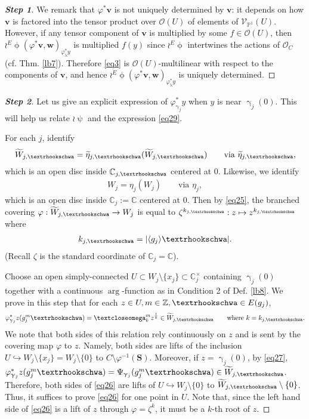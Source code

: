 \documentclass[11pt,b5paper,notitlepage]{article}
\theoremstyle{definition}
\theoremstyle{plain}
\newcommand{\wtd}{\widetilde}
\newcommand{\bk}[1]{\langle {#1}\rangle}
\newcommand{\scr}{\mathscr}
\newcommand{\Cbb}{\mathbb C}
\newcommand{\Zbb}{\mathbb Z}
\newcommand{\Pbb}{\mathbb P}
\newcommand{\Sbf}{\mathbf{S}}
\newcommand{\vbf}{\mathbf v}
\newcommand{\wbf}{\mathbf w}
\newcommand{\tipaomega}{\text{\textcloseomega}}
\newcommand{\tipae}{\text{\textrhookschwa}}
\numberwithin{equation}{subsection}
\begin{document}
\begin{proof}[\textbf{Step 1}]
We remark that $\varphi^*\vbf$ is not uniquely determined by $\vbf$: it depends  on how $\vbf$ is factored into the tensor product over $\scr O(U)$ of elements of $\scr V_{\Pbb^1}(U)$. However, if any tensor component of $\vbf$ is multiplied by some $f\in\scr O(U)$, then $\wr^E\upphi(\varphi^*\vbf,\wbf)_{\varphi_\uplambda^*y}$ is multiplied $f(y)$ since $\wr^E\upphi$ intertwines the actions of $\scr O_C$ (cf. Thm. \ref{lb7}). Therefore \eqref{eq3} is $\scr O(U)$-multilinear with respect to the   components of $\vbf$, and hence $\wr^E\upphi(\varphi^*\vbf,\wbf)_{\varphi_\uplambda^*y}$  is uniquely determined.
\end{proof}


\begin{proof}[\textbf{Step 2}] Let us give an explicit expression of $\varphi^*_{\upgamma_j}y$ when $y$ is near $\upgamma_j(0)$. This will help us relate $\wr\uppsi$ and the expression \eqref{eq29}. 

For each $j$, identify 
\begin{align*}
\wtd W_{j,\tipae}=\wtd\eta_{j,\tipae}(\wtd W_{j,\tipae})\qquad\text{via }	\wtd\eta_{j,\tipae},
\end{align*}
which is an open disc inside $\Cbb_{j,\tipae}$ centered at $0$. Likewise, we identify 
\begin{align*}
W_j=\eta_j(W_j) \qquad\text{via }\eta_j,	
\end{align*}
which is an open disc inside $\Cbb_j:=\Cbb$ centered at $0$. Then by \eqref{eq25}, the branched covering $\varphi:\wtd W_{j,\tipae}\rightarrow W_j$ is equal to $\zeta^{k_{j,\tipae}}:z\mapsto z^{k_{j,\tipae}}$ where
\begin{align*}
k_{j,\tipae}=|\bk{g_j}\tipae|.	
\end{align*}
(Recall $\zeta$ is the standard coordinate of $\Cbb_j=\Cbb$).

Choose an open simply-connected $U\subset W_j\setminus\{x_j\}\subset\Cbb_j^\times$ containing $\upgamma_j(0)$ together with a continuous $\arg$-function as in Condition 2 of Def. \ref{lb8}. We prove in this step that for each $z\in U,m\in\Zbb,\tipae\in E(g_j)$,
\begin{align}
\varphi^*_{\upgamma_j}z(g_j^m\tipae)=\tipaomega_k^mz^{\frac 1{k}}\in\wtd W_{j,\tipae}\qquad\text{where }k=k_{j,\tipae}.\label{eq26}
\end{align}	
We note that both sides of this relation rely continuously on $z$ and is sent by the covering map $\varphi$ to $z$. Namely, both sides are lifts of the inclusion $U\hookrightarrow W_j\setminus\{x_j\}=W_j\setminus\{0\}$ to  $C\setminus\varphi^{-1}(\Sbf)$. Moreover, if $z=\upgamma_j(0)$, by \eqref{eq27}, $\varphi^*_{\upgamma_j}z(g_j^m\tipae)=\Psi_{\upgamma_j}(g_j^m\tipae)\in\wtd W_{j,\tipae}$. Therefore, both sides of \eqref{eq26} are lifts of $U\hookrightarrow W_j\setminus\{0\}$ to $\wtd W_{j,\tipae}\setminus \{0\}$. Thus, it suffices to prove \eqref{eq26} for one point in $U$.  Note that, since the left hand side of \eqref{eq26} is a lift of $z$ through $\varphi=\zeta^k$, it must be a $k$-th root of $z$. 


\end{proof}
\end{document}
